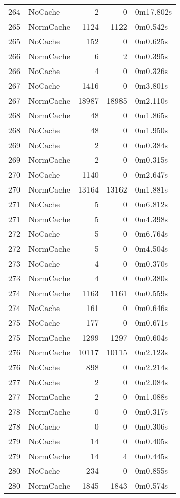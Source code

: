 \begin{tabular}{llrrl}
264 & NoCache & 2 & 0 & 0m17.802s \\
265 & NormCache & 1124 & 1122 & 0m0.542s \\
265 & NoCache & 152 & 0 & 0m0.625s \\
266 & NormCache & 6 & 2 & 0m0.395s \\
266 & NoCache & 4 & 0 & 0m0.326s \\
267 & NoCache & 1416 & 0 & 0m3.801s \\
267 & NormCache & 18987 & 18985 & 0m2.110s \\
268 & NormCache & 48 & 0 & 0m1.865s \\
268 & NoCache & 48 & 0 & 0m1.950s \\
269 & NoCache & 2 & 0 & 0m0.384s \\
269 & NormCache & 2 & 0 & 0m0.315s \\
270 & NoCache & 1140 & 0 & 0m2.647s \\
270 & NormCache & 13164 & 13162 & 0m1.881s \\
271 & NoCache & 5 & 0 & 0m6.812s \\
271 & NormCache & 5 & 0 & 0m4.398s \\
272 & NoCache & 5 & 0 & 0m6.764s \\
272 & NormCache & 5 & 0 & 0m4.504s \\
273 & NoCache & 4 & 0 & 0m0.370s \\
273 & NormCache & 4 & 0 & 0m0.380s \\
274 & NormCache & 1163 & 1161 & 0m0.559s \\
274 & NoCache & 161 & 0 & 0m0.646s \\
275 & NoCache & 177 & 0 & 0m0.671s \\
275 & NormCache & 1299 & 1297 & 0m0.604s \\
276 & NormCache & 10117 & 10115 & 0m2.123s \\
276 & NoCache & 898 & 0 & 0m2.214s \\
277 & NoCache & 2 & 0 & 0m2.084s \\
277 & NormCache & 2 & 0 & 0m1.088s \\
278 & NormCache & 0 & 0 & 0m0.317s \\
278 & NoCache & 0 & 0 & 0m0.306s \\
279 & NoCache & 14 & 0 & 0m0.405s \\
279 & NormCache & 14 & 4 & 0m0.445s \\
280 & NoCache & 234 & 0 & 0m0.855s \\
280 & NormCache & 1845 & 1843 & 0m0.574s \\

\end{tabular}
